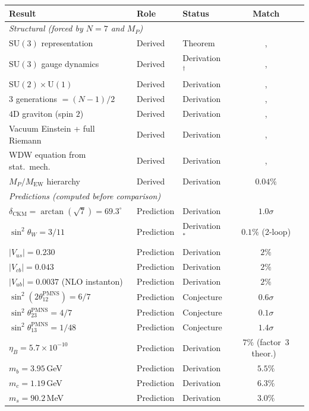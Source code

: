 \begin{center}
\small
\begin{tabular}{lllc}
\toprule
Result & Role & Status & Match \\
\midrule
\multicolumn{4}{l}{\emph{Structural (forced by $N = 7$ and $M_P$)}} \\
$\mathrm{SU}(3)$ representation & Derived & Theorem &, \\
$\mathrm{SU}(3)$ gauge dynamics & Derived & Derivation$^\dagger$ &, \\
$\mathrm{SU}(2) \times \mathrm{U}(1)$ & Derived & Derivation &, \\
$3$ generations $= (N{-}1)/2$ & Derived & Derivation &, \\
$4$D graviton (spin $2$) & Derived & Derivation &, \\
Vacuum Einstein + full Riemann & Derived & Derivation &, \\
WDW equation from stat.\ mech. & Derived & Derivation &, \\
$M_P/M_{\mathrm{EW}}$ hierarchy & Derived & Derivation & $0.04\%$ \\
\midrule
\multicolumn{4}{l}{\emph{Predictions (computed before comparison)}} \\
$\delta_{\mathrm{CKM}} = \arctan(\sqrt{7}) = 69.3^\circ$ & Prediction & Derivation & $1.0\sigma$ \\
$\sin^2\theta_W = 3/11$ & Prediction & Derivation$^*$ & $0.1\%$ (2-loop) \\
$|V_{us}| = 0.230$ & Prediction & Derivation & $2\%$ \\
$|V_{cb}| = 0.043$ & Prediction & Derivation & $2\%$ \\
$|V_{ub}| = 0.0037$ (NLO instanton) & Prediction & Derivation & $2\%$ \\
$\sin^2(2\theta_{12}^{\mathrm{PMNS}}) = 6/7$ & Prediction & Conjecture & $0.6\sigma$ \\
$\sin^2\theta_{23}^{\mathrm{PMNS}} = 4/7$ & Prediction & Conjecture & $0.1\sigma$ \\
$\sin^2\theta_{13}^{\mathrm{PMNS}} = 1/48$ & Prediction & Conjecture & $1.4\sigma$ \\
$\eta_B = 5.7 \times 10^{-10}$ & Prediction & Derivation & $7\%$ (factor~$3$ theor.)\ \\
$m_b = 3.95$\,GeV & Prediction & Derivation & $5.5\%$ \\
$m_c = 1.19$\,GeV & Prediction & Derivation & $6.3\%$ \\
$m_s = 90.2$\,MeV & Prediction & Derivation & $3.0\%$ \\

\end{tabular}
\end{center}
